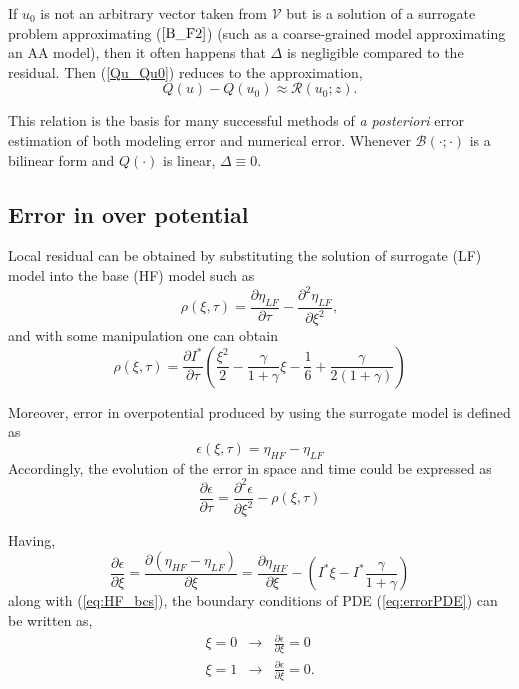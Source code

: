 \documentclass[]{article}
\begin{document}
If $u_0$ is not an arbitrary vector taken from $\mathcal{V}$ but is a solution of a surrogate problem approximating ($\ref{B_F2}$)
(such as a coarse-grained model approximating an AA model), then it often happens that $\Delta$ is negligible compared to the residual. Then (\ref{Qu_Qu0}) reduces to the approximation,
%
\begin{equation}\label{Qu_Qu0_noreminder}
Q(u) - Q(u_0) \approx \mathcal{R}(u_0;z).
\end{equation}
 
This relation is the basis for many successful methods of \textit{a posteriori} error estimation of both modeling error and numerical error. Whenever $\mathcal{B}(\cdot;\cdot)$ is a bilinear form and $Q(\cdot)$ is linear, $\Delta \equiv 0$.

\subsection{Error in over potential }
Local residual can be obtained by substituting the solution of surrogate (LF) model into the base (HF) model such as
%
\begin{equation}
\rho(\xi, \tau) = \frac{\partial{\eta_{LF}}}{\partial\tau} - \frac{\partial^2{\eta_{LF}}}{\partial\xi^2},
\end{equation}
%
and with some manipulation one can obtain
%
\begin{equation}\label{eq:residual}
\rho(\xi, \tau) = \frac{\partial I^*}{\partial\tau} \left(
\frac{\xi^2}{2} - \frac{\gamma}{1+\gamma}\xi - \frac{1}{6} + \frac{\gamma}{2(1+\gamma)}
\right)
\end{equation}


Moreover, error in overpotential produced by using the surrogate model is defined as
%
\begin{equation}\label{eq:error}
\epsilon(\xi,\tau) = \eta_{HF} - \eta_{LF}
\end{equation}
%
Accordingly, the evolution of the error in space and time could be expressed as
%
\begin{equation}\label{eq:errorPDE}
\frac{\partial\epsilon}{\partial\tau} = \frac{\partial^2\epsilon}{\partial\xi^2} - \rho(\xi,\tau)
\end{equation}
%

Having, 
%
\begin{equation}
\frac{\partial\epsilon}{\partial\xi} = \frac{\partial(\eta_{HF}-\eta_{LF})}{\partial\xi}
 = \frac{\partial\eta_{HF}}{\partial\xi}-(I^*\xi-I^*\frac{\gamma}{1+\gamma})
\end{equation}
%
along with (\ref{eq:HF_bcs}), the boundary conditions of PDE (\ref{eq:errorPDE}) can be written as,
\begin{eqnarray}\label{eq:error_bcs}
\xi = 0 &\rightarrow& \frac{\partial\epsilon}{\partial\xi}= 0\\
\xi = 1 &\rightarrow& \frac{\partial\epsilon}{\partial\xi}= 0. \nonumber
\end{eqnarray}
\end{document}
